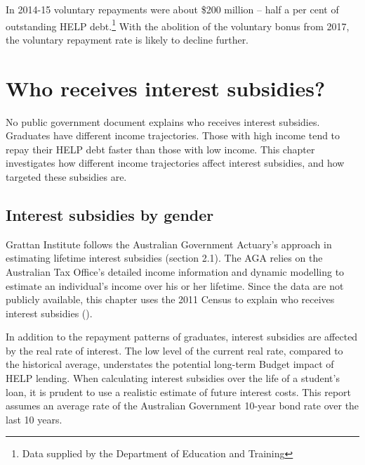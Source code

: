 \documentclass[embargoed]{grattan}
\begin{document}
In 2014-15 voluntary repayments were about \$200 million -- half a per cent of outstanding HELP debt.\footnote{Data supplied by the Department of Education and Training} With the abolition of the voluntary bonus from 2017, the voluntary repayment rate is likely to decline further.

\chapter{Who receives interest subsidies?}\label{chap:who-receives-interest-subsidies}

No public government document explains who receives interest subsidies. Graduates have different income trajectories. Those with high income tend to repay their HELP debt faster than those with low income. This chapter investigates how different income trajectories affect interest subsidies, and how targeted these subsidies are.

\section{Interest subsidies by gender}\label{sec:interest-subsidies-by-gender}

Grattan Institute follows the Australian Government Actuary's approach in estimating lifetime interest subsidies (section 2.1). The AGA relies on the Australian Tax Office's detailed income information and dynamic modelling to estimate an individual's income over his or her lifetime. Since the data are not publicly available, this chapter uses the 2011 Census to explain who receives interest subsidies ().

In addition to the repayment patterns of graduates, interest subsidies are affected by the real rate of interest. The low level of the current real rate, compared to the historical average, understates the potential long-term Budget impact of HELP lending. When calculating interest subsidies over the life of a student's loan, it is prudent to use a realistic estimate of future interest costs. This report assumes an average rate of the Australian Government 10-year bond rate over the last 10 years.
\end{document}
